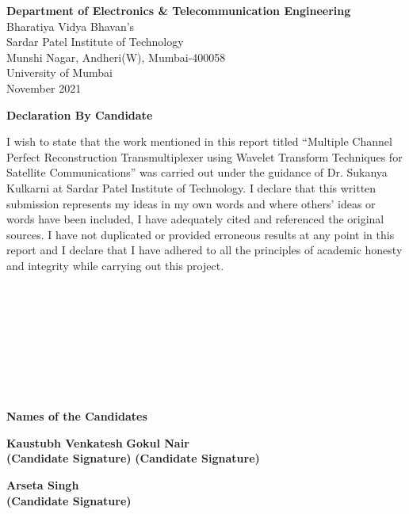 \begin{center}
\textbf {Department of Electronics \& Telecommunication Engineering}\\
Bharatiya  Vidya Bhavan's\\
Sardar Patel Institute of Technology\\
Munshi Nagar, Andheri(W), Mumbai-400058\\
University of Mumbai\\
November 2021\\
\end{center}

\newpage
\thispagestyle{empty}
\vspace*{0.2cm}
\vspace{1cm}
\begin{center}
 \large\textbf{Declaration By Candidate}
\end{center}
\vspace{2cm}
I wish to state that the work mentioned in this report titled ``Multiple Channel Perfect Reconstruction Transmultiplexer using Wavelet Transform Techniques for Satellite Communications'' was carried out under the guidance of Dr. Sukanya Kulkarni at Sardar Patel Institute of Technology. I declare that this written submission represents my ideas in my own words and where others' ideas or words have been included, I have adequately cited and referenced the original sources. I have not duplicated or provided erroneous results at any point in this report and I declare that I have adhered to all the principles of academic honesty and integrity while carrying out this project. \\
\\
\\
\\
\\
\\
\\
\\
\\
\begin{center}
\textbf{Names of the Candidates}
\end{center}
\vspace{1.5cm}
\hspace{0.05cm}
\textbf {Kaustubh Venkatesh} \hspace{3in} \textbf{Gokul Nair}\\ 
\textbf {(Candidate Signature)} \hspace{2.5in} \textbf{(Candidate Signature)} \\
\vspace{1cm}
 

\begin{center}
\textbf{Arseta Singh}\\
\textbf{(Candidate Signature)}
\end{center}